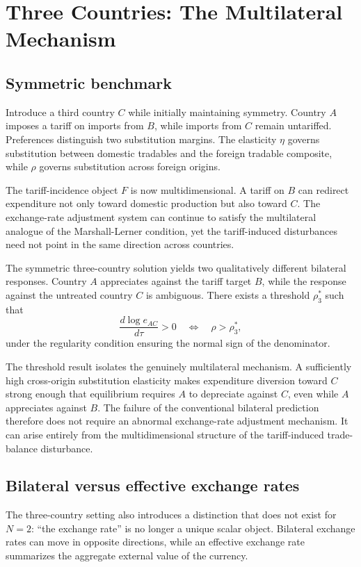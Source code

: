 \documentclass[11pt]{article}
\begin{document}
\section{Three Countries: The Multilateral Mechanism}

\subsection{Symmetric benchmark}

Introduce a third country $C$ while initially maintaining symmetry. Country $A$ imposes a tariff on imports from $B$, while imports from $C$ remain untariffed. Preferences distinguish two substitution margins. The elasticity $\eta$ governs substitution between domestic tradables and the foreign tradable composite, while $\rho$ governs substitution across foreign origins.

The tariff-incidence object $F$ is now multidimensional. A tariff on $B$ can redirect expenditure not only toward domestic production but also toward $C$. The exchange-rate adjustment system can continue to satisfy the multilateral analogue of the Marshall-Lerner condition, yet the tariff-induced disturbances need not point in the same direction across countries.

The symmetric three-country solution yields two qualitatively different bilateral responses. Country $A$ appreciates against the tariff target $B$, while the response against the untreated country $C$ is ambiguous. There exists a threshold $\rho_3^*$ such that
\[
\frac{d\log e_{AC}}{d\tau}>0
\quad\Longleftrightarrow\quad
\rho>\rho_3^*,
\]
under the regularity condition ensuring the normal sign of the denominator.

The threshold result isolates the genuinely multilateral mechanism. A sufficiently high cross-origin substitution elasticity makes expenditure diversion toward $C$ strong enough that equilibrium requires $A$ to depreciate against $C$, even while $A$ appreciates against $B$. The failure of the conventional bilateral prediction therefore does not require an abnormal exchange-rate adjustment mechanism. It can arise entirely from the multidimensional structure of the tariff-induced trade-balance disturbance.

\subsection{Bilateral versus effective exchange rates}

The three-country setting also introduces a distinction that does not exist for $N=2$: ``the exchange rate'' is no longer a unique scalar object. Bilateral exchange rates can move in opposite directions, while an effective exchange rate summarizes the aggregate external value of the currency.
\end{document}
